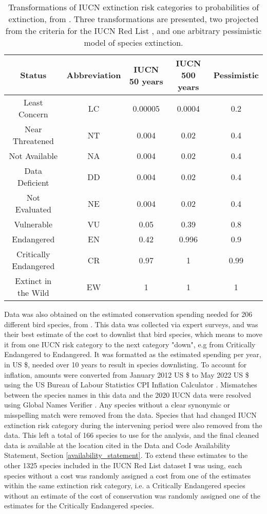 \documentclass[12pt]{article}
\begin{document}
	\begin{table}[b!]
		\centering
		\caption{Transformations of IUCN extinction risk categories to probabilities
			of extinction, from \citet{mooersConvertingEndangeredSpecies2008}.
			Three transformations are presented, two projected from the
			criteria for the IUCN Red List \citep{iucnIUCNRedList2012},
			and one arbitrary pessimistic model of species extinction.
		}\label{ext_prob}
		\begin{tabular}{|c|c c c c|}
			\hline
			Status & Abbreviation & IUCN 50 years & IUCN 500 years & Pessimistic \\
			\hline
			Least Concern & LC & 0.00005 & 0.0004 & 0.2 \\
			Near Threatened & NT & 0.004 & 0.02 & 0.4 \\
			Not Available & NA & 0.004 & 0.02 & 0.4 \\
			Data Deficient & DD & 0.004 & 0.02 & 0.4 \\
			Not Evaluated & NE & 0.004 & 0.02 & 0.4 \\
			Vulnerable & VU & 0.05 & 0.39 & 0.8 \\
			Endangered & EN & 0.42 & 0.996 & 0.9 \\
			Critically Endangered & CR & 0.97 & 1 & 0.99 \\
			Extinct in the Wild & EW & 1 & 1 & 1 \\
			\hline
		\end{tabular}
	\end{table}
	
	Data was also obtained on the estimated conservation spending needed for 206 different bird species, from \citet{mccarthyFinancialCostsMeeting2012}. This data was collected via expert surveys, and was their best estimate of the cost to downlist that bird species,
	which means to move it from one IUCN risk category to the next category
	"down", e.g from Critically Endangered
	to Endangered. It was formatted as the estimated spending per year, in US \$, needed over 10 years to result in species downlisting. To account for inflation, amounts were converted from January 2012
	US \$ to May 2022 US \$ using the US Bureau of Labour Statistics CPI Inflation Calculator
	\citep{CPIInflationCalculator}. %
	Mismatches between the species names in this data and the 2020 IUCN data were resolved using Global Names Verifier \citep{mozzherinGnamesGnverifierV12022}. Any species without a clear synonymic or misspelling match were removed from the data. Species that had changed IUCN extinction risk category
	during the intervening period were also removed from the data. This left a total of 166 species to use for the analysis, and the final cleaned data is available at the location cited in the Data and Code Availability Statement, Section
	\ref{availability_statement}. 
	To extend these estimates to the other 1325 species included in the IUCN Red List dataset I was 
	using, each species without a cost was randomly assigned a cost from one of the estimates within
	the same extinction risk category, i.e. a Critically Endangered species
	without an estimate of the cost of conservation was randomly assigned
	one of the estimates for the Critically Endangered species.
	
\end{document}
